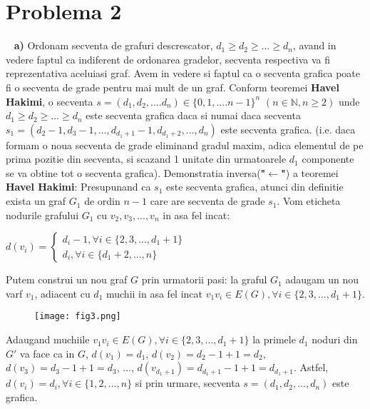 \documentclass{article}
\begin{document}
\section{Problema 2}
\   
\newline
\textbf{a)} 
Ordonam secventa de grafuri descrescator, $d_1 \geq d_2 \geq ...\geq d_n$, avand in vedere faptul ca indiferent de ordonarea gradelor, secventa respectiva va fi reprezentativa aceluiasi graf. Avem in vedere si faptul ca o secventa grafica poate fi o secventa de grade pentru mai mult de un graf.
\newline
\newline
Conform teoremei \textbf{Havel Hakimi}, o secventa $s=(d_1,d_2,....d_n)\in \{0,1,....n-1\}^n$ $(n \in \mathbb{N}, n \geq 2)$ unde $d_1 \geq d_2 \geq ...\geq d_n$ este secventa grafica daca si numai daca secventa $s_1=(d_2-1, d_3-1, ...,
d_{d_1+1}-1, d_{d_1+2},..., d_n)$ este secventa grafica. (i.e. daca formam o noua secventa de grade eliminand gradul maxim, adica elementul de pe prima pozitie din secventa, si scazand 1 unitate din urmatoarele $d_1$ componente se va obtine tot o secventa grafica).
\newline
\newline
Demonstratia inversa(\textbf{"$\leftarrow$"}) a teoremei \textbf{Havel Hakimi}:
\newline
\newline
Presupunand ca $s_1$ este secventa grafica, atunci din definitie exista un graf $G_1$ de ordin $n-1$ care are secventa de grade $s_1$. 
\newline
\newline
Vom eticheta nodurile grafului $G_1$ cu $v_2, v_3,..., v_n$ in asa fel incat:
\begin{center}
$d(v_i)=\begin{cases} d_i-1, \forall i \in \{2,3,..., d_1+1\} \\ d_i, \forall i \in \{d_1+2,..., n\} \end{cases}$
\end{center}
Putem construi un nou graf $G$ prin urmatorii pasi: la graful $G_1$ adaugam un nou varf $v_1$, adiacent cu $d_1$ muchii in asa fel incat $v_1v_i \in E(G), \forall i \in \{2,3,..., d_1+1\}$. 
\begin{figure}[h]
\centering
\texttt{[image: fig3.png]}
\end{figure}
\newline
Adaugand muchiile $v_1v_i \in E(G), \forall i \in \{2,3,..., d_1+1\}$ la primele $d_1$ noduri din $G'$ va face ca in $G$, $d(v_1)=d_1$, $d(v_2)=d_2-1+1=d_2$, $d(v_3)=d_3-1+1=d_3$, ..., $d(v_{d_1+1})=d_{d_1+1}-1+1=d_{d_1+1}$. Astfel, $d(v_i)=d_i, \forall i \in \{1,2,..., n\}$ si prin urmare, secventa $s=(d_1,d_2,..., d_n)$ este grafica.
\end{document}
